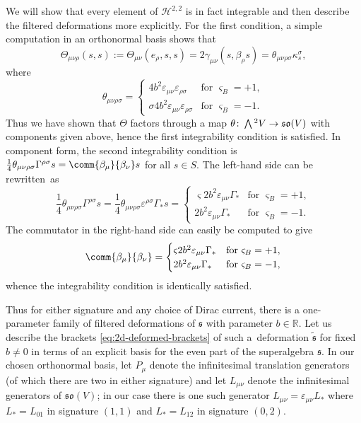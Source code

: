 \documentclass[10pt,a4paper]{amsart}
\numberwithin{equation}{section}
\newcommand{\fs}{\mathfrak{s}}
\newcommand{\fso}{\mathfrak{so}}
\newcommand{\RR}{\mathbb{R}}
\newcommand{\cH}{\mathcal{H}}
\newcommand{\fstilde}{\widetilde{\fs}}
\newcommand{\Wedge}{\mathchoice{{\textstyle\bigwedge}}{\bigwedge}{\bigwedge}{\bigwedge}}	%
\newcommand{\1}{\mathbbm{1}}
\begin{document}
We will show that every element of $\cH^{2,2}$ is in fact integrable and then describe the filtered deformations more explicitly. For the first condition, a simple computation in an orthonormal basis shows that
\[
	\Theta_{\mu\nu\rho}(s,s)
	:= \Theta_{\mu\nu}(e_\rho,s,s)
	= 2\gamma_{\mu\nu}(s,\beta_\rho s)
	= \theta_{\mu\nu\rho\sigma}\kappa_s^\sigma,
\]
where
\[
	\theta_{\mu\nu\rho\sigma} =
		\begin{cases}
			4b^2\varepsilon_{\mu\nu}\varepsilon_{\rho\sigma}
				& \text{for } \varsigma_B = +1,	\\
			\sigma 4b^2\varepsilon_{\mu\nu}\varepsilon_{\rho\sigma}
				& \text{for } \varsigma_B = -1.
		\end{cases}
\]
Thus we have shown that $\Theta$ factors through a map $\theta\colon\Wedge^2 V\to \fso(V)$ with components given above, hence the first integrability condition is satisfied. In component form, the second integrability condition is
$\frac{1}{4}\theta_{\mu\nu\rho\sigma}\Gamma^{\rho\sigma}s = \comm{\beta_\mu}{\beta_\nu}s
$
for all $s\in S$. The left-hand side can be rewritten~as
\[
	\frac{1}{4}\theta_{\mu\nu\rho\sigma}\Gamma^{\rho\sigma}s
		= \frac{1}{4}\theta_{\mu\nu\rho\sigma}\varepsilon^{\rho\sigma}\Gamma_*s
		= 	\begin{cases}
				\varsigma 2b^2\varepsilon_{\mu\nu}\Gamma_*
					& \text{for } \varsigma_B = +1,	\\
				2b^2\varepsilon_{\mu\nu}\Gamma_*
					& \text{for } \varsigma_B = -1.
			\end{cases}
\]
The commutator in the right-hand side can easily be computed to give
\[
	\comm{\beta_\mu}{\beta_\nu} =
		\begin{cases}
			\varsigma 2b^2\varepsilon_{\mu\nu}\Gamma_*
				& \text{for } \varsigma_B = +1,	\\
			2b^2\varepsilon_{\mu\nu}\Gamma_*
				& \text{for } \varsigma_B = -1,
		\end{cases}
\]
whence the integrability condition is identically satisfied.

Thus for either signature and any choice of Dirac current, there is a one-parameter family of filtered deformations of $\fs$ with parameter $b\in\RR$. Let us describe the brackets \eqref{eq:2d-deformed-brackets} of such a~deformation $\fstilde$ for fixed $b\neq 0$ in terms of an explicit basis for the even part of the superalgebra $\fs$. In our chosen orthonormal basis, let $P_\mu$ denote the infinitesimal translation generators (of which there are two in either signature) and let $L_{\mu\nu}$ denote the infinitesimal generators of $\fso(V)$; in our case there is one such generator $L_{\mu\nu}=\varepsilon_{\mu\nu} L_*$ where $L_* = L_{01}$ in signature $(1,1)$ and $L_*=L_{12}$ in signature $(0,2)$.
\end{document}

